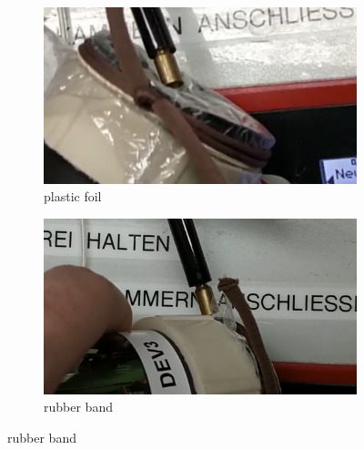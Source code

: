 \begin{figure}[h]
	\centering
	
	\begin{subfigure}[b]{0.4\textwidth}
		\includegraphics[width=\textwidth]{./Chapters/CRT-handling/plastic_foil}
		\caption{plastic foil}
	\end{subfigure}
	\hspace{0.1\textwidth}
	\begin{subfigure}[b]{0.4\textwidth}
		\includegraphics[width=\textwidth]{./Chapters/CRT-handling/rubber_band}
		\caption{rubber band}
	\end{subfigure}

	\vspace{1cm}
	

\end{figure}
